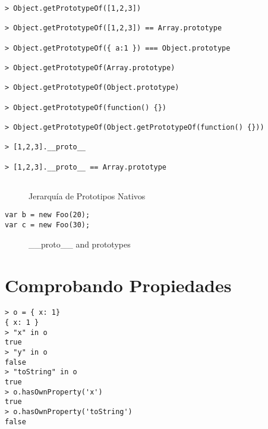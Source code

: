 \begin{enumerate}
\begin{verbatim}
> Object.getPrototypeOf([1,2,3])

> Object.getPrototypeOf([1,2,3]) == Array.prototype

> Object.getPrototypeOf({ a:1 }) === Object.prototype

> Object.getPrototypeOf(Array.prototype)

> Object.getPrototypeOf(Object.prototype)

> Object.getPrototypeOf(function() {})

> Object.getPrototypeOf(Object.getPrototypeOf(function() {}))

> [1,2,3].__proto__

> [1,2,3].__proto__ == Array.prototype


\end{verbatim}
\end{enumerate}

\begin{figure}[htb]
\begin{center}
\centerline{}
\end{center}
\label{figure:javascriptnatives}
\caption{Jerarquía de Prototipos Nativos}
\end{figure}


\begin{verbatim}
var b = new Foo(20);
var c = new Foo(30);
\end{verbatim}
\begin{figure}[htb]
\begin{center}
\centerline{}
\end{center}
\label{figure:javascriptnatives}
\caption{\_\_proto\_\_ and prototypes}
\end{figure}

\section{Comprobando Propiedades}

\begin{verbatim}
> o = { x: 1}
{ x: 1 }
> "x" in o
true
> "y" in o
false
> "toString" in o
true
> o.hasOwnProperty('x')
true
> o.hasOwnProperty('toString')
false
\end{verbatim}

